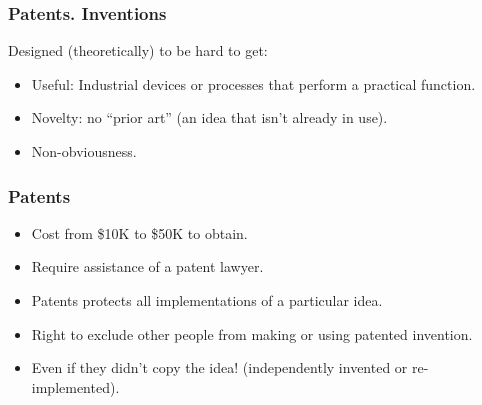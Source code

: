 \begin{frame}
\frametitle{Patents. Inventions}

Designed (theoretically) to be hard to get:

\begin{itemize}
\item \alert{Useful}: Industrial devices or processes that perform a practical function.
\item \alert{Novelty}: no ``prior art'' (an idea that isn't already in use).
\item \alert{Non-obviousness}.
\end{itemize}                                                 

\end{frame}

\begin{frame}
\frametitle{Patents}

\begin{itemize}
\item Cost from \$10K to \$50K to obtain.
\item Require assistance of a patent lawyer.
\item Patents protects \alert{all} implementations of a particular idea.
\item \alert{Right to exclude} other people from making or using patented invention.
\item Even if they didn't copy the idea! (independently invented or re-implemented).
\end{itemize}                                                 

\end{frame}



